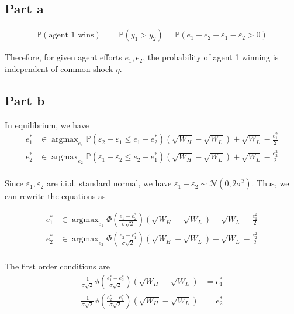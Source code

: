 \subsection*{Part a}

\begin{align*}
    \mathbb P(\text{agent 1 wins}) &= \mathbb P(y_1 > y_2) = \mathbb P(e_1 - e_2 + \varepsilon_1 - \varepsilon_2 > 0)
\end{align*}

Therefore, for given agent efforts $e_1, e_2$, the probability of agent 1 winning is independent of common shock $\eta$.

\subsection*{Part b}

In equilibrium, we have 
\begin{align*}
    e_1^* &\in \operatorname{argmax}_{e_1} \mathbb P(\varepsilon_2 - \varepsilon_1 \le e_1 - e_2^*)(\sqrt{ W_H} - \sqrt{ W_L}) + \sqrt{ W_L} - \frac{e_1^2}{2}\\
    e_2^* &\in \operatorname{argmax}_{e_2} \mathbb P(\varepsilon_1 - \varepsilon_2 \le e_2 - e_1^*)(\sqrt{ W_H} - \sqrt{ W_L}) + \sqrt{ W_L} - \frac{e_2^2}{2}\\
\end{align*}

Since $\varepsilon_1, \varepsilon_2$ are i.i.d. standard normal, we have $\varepsilon_1 - \varepsilon_2 \sim \mathcal{N}(0, 2 \sigma^2)$. Thus, we can rewrite the equations as

\begin{align*}
    e_1^* &\in \operatorname{argmax}_{e_1} \Phi\left(\frac{e_1 - e_2^*}{\sigma\sqrt 2}\right)(\sqrt{ W_H} - \sqrt{ W_L}) + \sqrt{ W_L} - \frac{e_1^2}{2}\\
    e_2^* &\in \operatorname{argmax}_{e_2} \Phi\left(\frac{e_2 - e_1^*}{\sigma\sqrt 2}\right)(\sqrt{ W_H} - \sqrt{ W_L}) + \sqrt{ W_L} - \frac{e_2^2}{2}\\
\end{align*}

The first order conditions are 
\begin{align*}
    \frac{1}{\sigma\sqrt 2}\phi\left(\frac{e_1^* - e_2^*}{\sigma\sqrt 2}\right)(\sqrt{ W_H} - \sqrt{ W_L}) &= e_1^*\\
    \frac{1}{\sigma\sqrt 2}\phi\left(\frac{e_2^* - e_1^*}{\sigma\sqrt 2}\right)(\sqrt{ W_H} - \sqrt{ W_L}) &= e_2^*\\
\end{align*}

